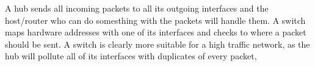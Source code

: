 A hub sends all incoming packets to all its outgoing interfaces and the host/router who can do somesthing with the packets will handle them.
A switch maps hardware addresses with one of its interfaces and checks to where a packet should be sent.
A switch is clearly more suitable for a high traffic network, as the hub will pollute all of its interfaces with duplicates of every packet,